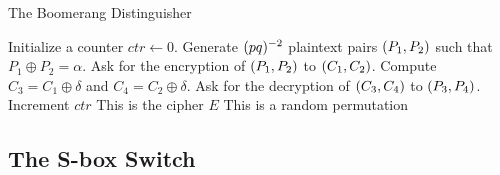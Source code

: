 \documentclass[notheorems]{beamer}
\theoremstyle{definition}
\theoremstyle{example}
\begin{document}
    \begin{frame}{The Boomerang Distinguisher}
        \begin{algorithm}[H]
            \caption{The Boomerang Attack Distinguisher}
            \label{alg:boomerang-dist}
            \algrenewcommand{}
            \small
            \begin{algorithmic}[1]
                \State Initialize a counter \(ctr \gets 0\). 
                \State Generate \((pq)^{-2}\) plaintext pairs \((P_1, P_2)\)
                such that \(P_1 \oplus P_2 = \alpha\).
                    \State Ask for the encryption of \((P_1, P_2)\) to \((C_1,
                    C_2)\).
                    \State Compute \(C_3 = C_1 \oplus \delta\) and \(C_4 = C_2 \oplus 
                    \delta\). 
                    \State Ask for the decryption of \((C_3, C_4)\) to \((P_3,
                    P_4)\).
                        \State Increment \(ctr\)
                    \EndIf
                \EndFor
                    \State \Return This is the cipher \(E\)
                \Else
                    \State \Return This is a random permutation
                \EndIf
            \end{algorithmic}
        \end{algorithm}
    \end{frame}

    \subsection{The S-box Switch}
    \label{subsec:s-box-switch}
    
\end{document}
